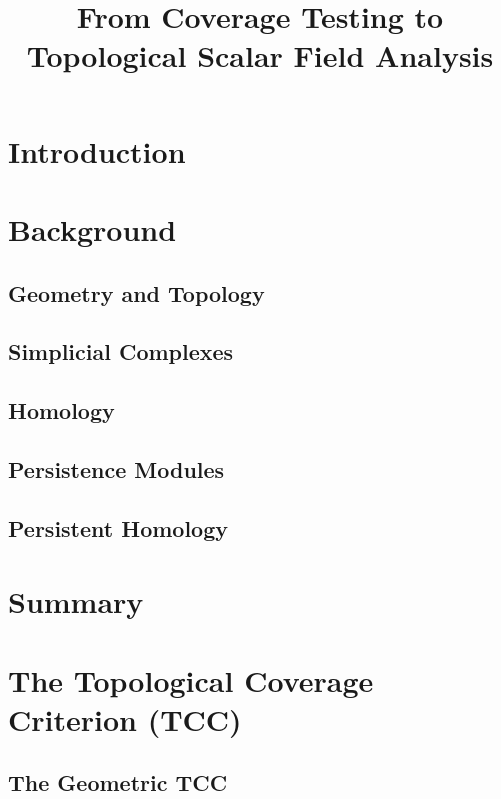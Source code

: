 \documentclass[12pt]{article}
\title{From Coverage Testing to Topological Scalar Field Analysis}
\begin{document}
\maketitle



\section{Introduction}\label{sec:introduction}
  
  

\clearpage
\section{Background}
  \subsection{Geometry and Topology}
    
  \subsection{Simplicial Complexes}\label{sec:complexes}
    
  \subsection{Homology}\label{sec:homology}
    
  \subsection{Persistence Modules}
    
  \subsection{Persistent Homology}
    


\section{Summary}\label{sec:summary}


\section{The Topological Coverage Criterion (TCC)}\label{sec:tcc}




\subsection{The Geometric TCC}\label{sec:geo_tcc}
  
\end{document}
